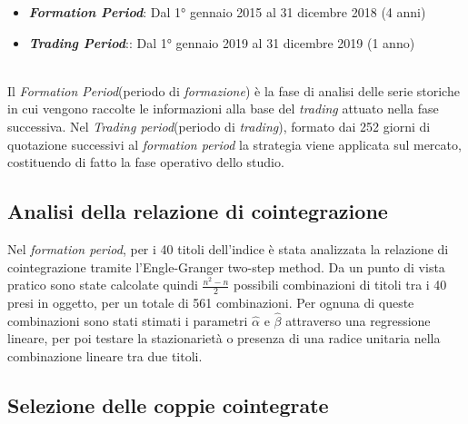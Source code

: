 \documentclass[]{article}
\begin{document}
\begin{itemize}
	\item \textbf{\textit{Formation Period}}: Dal 1° gennaio 2015 al 31 dicembre 2018 (4 anni)
	\item \textbf{\textit{Trading Period}}::  Dal 1° gennaio 2019 al 31 dicembre 2019 (1 anno)
\end{itemize}
\
\\
Il \textit{Formation Period}(periodo di \textit{formazione}) è la fase di analisi delle serie storiche in cui vengono raccolte le informazioni alla base del \textit{trading} attuato nella fase successiva.
Nel \textit{Trading period}(periodo di \textit{trading}), formato dai 252 giorni di quotazione successivi al \textit{formation period} la strategia viene applicata sul mercato, costituendo di fatto la fase operativo dello studio.


\subsection{Analisi della relazione di cointegrazione}

Nel \textit{formation period}, per i 40 titoli dell'indice è stata analizzata la relazione di cointegrazione tramite l'Engle-Granger two-step method.
Da un punto di vista pratico sono state calcolate quindi $\frac{n^2-n}{2}$ possibili combinazioni di titoli tra i 40 presi in oggetto, per un totale di 561 combinazioni.
Per ognuna di queste combinazioni 
sono stati stimati i parametri $\hat{\alpha}$ e $\hat{\beta}$ attraverso una regressione lineare, per poi testare la stazionarietà o presenza di una radice unitaria nella combinazione lineare tra due titoli.

\subsection{Selezione delle coppie cointegrate}
\end{document}
